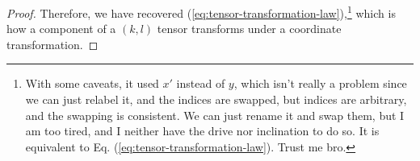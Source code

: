 \documentclass[12pt,a4paper]{article}
\begin{document}
\begin{solution_pset}
\begin{proof}
		Therefore, we have recovered (\ref{eq:tensor-transformation-law}),\footnote{
			With some caveats, it used $x'$ instead of $y$, which isn't really
			a problem since we can just relabel it, and the indices are 
			swapped, but indices are arbitrary, and the swapping is consistent.
			We can just rename it and swap them, but I am too tired, and I neither
			have the drive nor inclination to do so.
			It is equivalent to Eq. (\ref{eq:tensor-transformation-law}). Trust me bro.
		} which is how a component of a $(k,l)$ tensor transforms under a
		coordinate transformation.
		\end{proof}
		


	\end{solution_pset}
\end{document}
